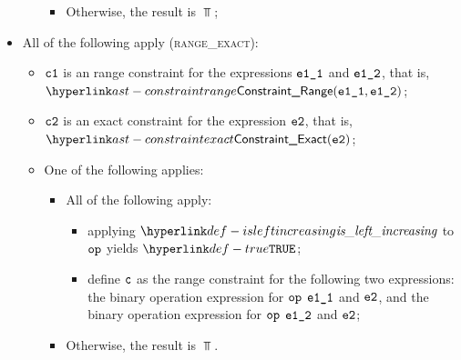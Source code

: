 \begin{itemize}
\begin{itemize}
\begin{itemize}
      \item Otherwise, the result is $\Top$;
    \end{itemize}
  \end{itemize}

  \item All of the following apply (\textsc{range\_exact}):
  \begin{itemize}
    \item $\texttt{c1}$ is an range constraint for the expressions $\texttt{e1\_1}$ and $\texttt{e1\_2}$, that is, \\ $\ConstraintRange(\veoneone, \veonetwo)$;
    \item $\texttt{c2}$ is an exact constraint for the expression $\texttt{e2}$, that is, $\ConstraintExact(\vetwo)$;
    \item One of the following applies:
    \begin{itemize}
      \item All of the following apply:
      \begin{itemize}
        \item applying $\isleftincreasing$ to $\texttt{op}$ yields $\True$;
        \item define $\texttt{c}$ as the range constraint for the following two expressions:
              the binary operation expression for $\texttt{op}$ $\texttt{e1\_1}$ and $\texttt{e2}$, and
              the binary operation expression for $\texttt{op}$ $\texttt{e1\_2}$ and $\texttt{e2}$;
      \end{itemize}
      \item Otherwise, the result is $\Top$.
    \end{itemize}
  \end{itemize}


\end{itemize}
